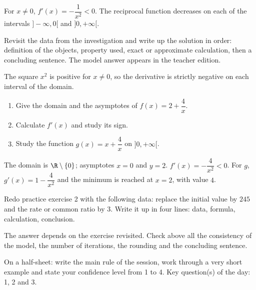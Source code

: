 \begin{summary}For $x\neq0$, $f'(x)=-\dfrac1{x^2}<0$. The reciprocal function decreases on each of the intervals $]-\infty,0[$ and $]0,+\infty[$.\end{summary}

\begin{example}
Revisit the data from the investigation and write up the solution in order: definition of the objects, property used, exact or approximate calculation, then a concluding sentence. The model answer appears in the teacher edition.
\end{example}
\begin{solution}The square $x^2$ is positive for $x\neq0$, so the derivative is strictly negative on each interval of the domain.\end{solution}

\begin{exercise}[essential]
\begin{enumerate}\item Give the domain and the asymptotes of $f(x)=2+\dfrac{4}x$.\item Calculate $f'(x)$ and study its sign.\item Study the function $g(x)=x+\dfrac{4}x$ on $]0,+\infty[$.\end{enumerate}
\end{exercise}
\begin{solution}The domain is $\R\setminus\{0\}$; asymptotes $x=0$ and $y=2$. $f'(x)=-\dfrac{4}{x^2}<0$. For $g$, $g'(x)=1-\dfrac{4}{x^2}$ and the minimum is reached at $x=2$, with value $4$.\end{solution}


\begin{homework}Redo practice exercise 2 with the following data: replace the initial value by $245$ and the rate or common ratio by $3$. Write it up in four lines: data, formula, calculation, conclusion.\end{homework}
\begin{solution}The answer depends on the exercise revisited. Check above all the consistency of the model, the number of iterations, the rounding and the concluding sentence.\end{solution}

\begin{exitticket}[3 minutes]On a half-sheet: write the main rule of the session, work through a very short example and state your confidence level from 1 to 4. Key question(s) of the day: 1, 2 and 3.\end{exitticket}

